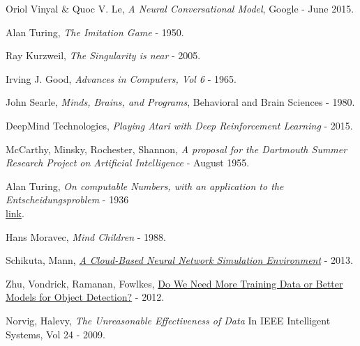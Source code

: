 \documentclass[12pt]{article}
\begin{document}
\pagebreak

\printglossaries
\pagebreak


\begin{thebibliography}{20}

   Oriol Vinyal \& Quoc V. Le,
  {\em A Neural Conversational Model}, Google - June 2015.

   Alan Turing, {\em The Imitation Game} - 1950.

   Ray Kurzweil, {\em The Singularity is near} - 2005.

   Irving J. Good, {\em Advances in Computers, Vol 6} - 1965.

   John Searle, {\em Minds, Brains, and Programs},
  Behavioral and Brain Sciences - 1980.

   DeepMind Technologies, {\em Playing Atari with Deep
  Reinforcement Learning} - 2015.

   McCarthy, Minsky, Rochester, Shannon, {\em
  A proposal for the Dartmouth Summer Research Project on Artificial
  Intelligence} - August 1955.

   Alan Turing, {\em On computable Numbers, with an
  application to the Entscheidungsproblem} - 1936 \\
  \href{http://www.cs.virginia.edu/~robins/Turing_Paper_1936.pdf}{link}.

   Hans Moravec, {\em Mind Children} - 1988.

   Schikuta, Mann,
  \href{http://eprints.cs.univie.ac.at/3708/1/paper57.pdf}
  {{\em A Cloud-Based Neural Network Simulation Environment}} - 2013.

   Zhu, Vondrick, Ramanan, Fowlkes,
  \href{http://web.mit.edu/vondrick/largetrain.pdf}
  {Do We Need More Training Data or Better Models for Object Detection?} - 2012.

   Norvig, Halevy, {\em The Unreasonable Effectiveness of Data}
  In IEEE Intelligent Systems, Vol 24 - 2009.


\end{thebibliography}
\end{document}
